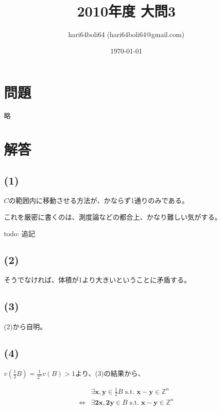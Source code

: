 \documentclass[a4paper, 10pt, dvipdfmx]{jlreq}
\begin{document}
\title{2010年度 大問3}
\author{hari64boli64 (hari64boli64@gmail.com)}
\date{\today}
\maketitle

\section{問題}

略

\section{解答}

\subsection*{(1)}

$C$の範囲内に移動させる方法が、かならず1通りのみである。

これを厳密に書くのは、測度論などの都合上、かなり難しい気がする。

todo: 追記

\subsection*{(2)}

そうでなければ、体積が1より大きいということに矛盾する。

\subsection*{(3)}

(2)から自明。

\subsection*{(4)}

$v(\frac{1}{2}B)=\frac{1}{2^n}v(B) > 1$より、(3)の結果から、

\begin{align*}
                  & \exists \bm{x},\bm{y} \in \frac{1}{2}B \text{ s.t. } \bm{x}-\bm{y} \in \mathbb{Z}^n \\
  \Leftrightarrow & \exists \bm{2x},\bm{2y} \in B \text{ s.t. } \bm{x}-\bm{y} \in \mathbb{Z}^n          \\
\end{align*}
\end{document}
